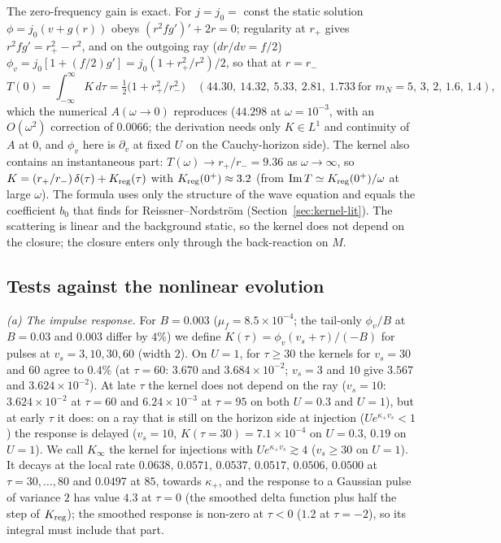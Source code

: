 \documentclass[11pt]{article}
\begin{document}
The zero-frequency gain is exact. For $j=j_0=$ const the static solution $\phi=j_0(v+g(r))$ obeys $(r^2fg')'+2r=0$; regularity at $r_+$ gives $r^2fg'=r_+^2-r^2$, and on the outgoing ray ($dr/dv=f/2$) $\phi_v=j_0[1+(f/2)g']=j_0(1+r_+^2/r^2)/2$, so that at $r=r_-$
\begin{equation}
T(0)=\int_{-\infty}^\infty K\,d\tau=\tfrac12\bigl(1+r_+^2/r_-^2\bigr)\quad(44.30,\ 14.32,\ 5.33,\ 2.81,\ 1.733\ \text{for } m_N=5,\,3,\,2,\,1.6,\,1.4),
\label{eq:T0}
\end{equation}
which the numerical $A(\omega\to0)$ reproduces ($44.298$ at $\omega=10^{-3}$, with an $O(\omega^2)$ correction of $0.0066$; the derivation needs only $K\in L^1$ and continuity of $A$ at $0$, and $\phi_v$ here is $\partial_v$ at fixed $U$ on the Cauchy-horizon side). The kernel also contains an instantaneous part: $T(\omega)\to r_+/r_-=9.36$ as $\omega\to\infty$, so $K=(r_+/r_-)\,\delta(\tau)+K_{\rm reg}(\tau)$ with $K_{\rm reg}(0^+)\approx3.2$ (from $\mathrm{Im}\,T\simeq K_{\rm reg}(0^+)/\omega$ at large $\omega$). The formula uses only the structure of the wave equation and equals the coefficient $b_0$ that \citet{Ori1998} finds for Reissner--Nordstr\"om (Section~\ref{sec:kernel-lit}). The scattering is linear and the background static, so the kernel does not depend on the closure; the closure enters only through the back-reaction on $M$.

\subsection{Tests against the nonlinear evolution}
\label{sec:kernel-tests}

\emph{(a) The impulse response.} For $B=0.003$ ($\mu_f=8.5\times10^{-4}$; the tail-only $\phi_v/B$ at $B=0.03$ and $0.003$ differ by $4\%$) we define $K(\tau)=\phi_v(v_s+\tau)/(-B)$ for pulses at $v_s=3,10,30,60$ (width $2$). On $U=1$, for $\tau\ge30$ the kernels for $v_s=30$ and $60$ agree to $0.4\%$ (at $\tau=60$: $3.670$ and $3.684\times10^{-2}$; $v_s=3$ and $10$ give $3.567$ and $3.624\times10^{-2}$). At late $\tau$ the kernel does not depend on the ray ($v_s=10$: $3.624\times10^{-2}$ at $\tau=60$ and $6.24\times10^{-3}$ at $\tau=95$ on both $U=0.3$ and $U=1$), but at early $\tau$ it does: on a ray that is still on the horizon side at injection ($Ue^{\kappa_+v_s}<1$) the response is delayed ($v_s=10$, $K(\tau=30)=7.1\times10^{-4}$ on $U=0.3$, $0.19$ on $U=1$). We call $K_\infty$ the kernel for injections with $Ue^{\kappa_+v_s}\gtrsim4$ ($v_s\ge30$ on $U=1$). It decays at the local rate $0.0638,\,0.0571,\,0.0537,\,0.0517,\,0.0506,\,0.0500$ at $\tau=30,\dots,80$ and $0.0497$ at $85$, towards $\kappa_+$, and the response to a Gaussian pulse of variance $2$ has value $4.3$ at $\tau=0$ (the smoothed delta function plus half the step of $K_{\rm reg}$); the smoothed response is non-zero at $\tau<0$ ($1.2$ at $\tau=-2$), so its integral must include that part.
\end{document}
